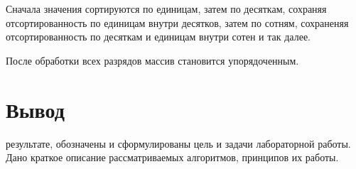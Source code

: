 Сначала значения сортируются по единицам, затем по десяткам, сохраняя отсортированность по единицам внутри десятков, затем по сотням, сохраненяя отсортированность по десяткам и единицам внутри сотен и так далее.

После обработки всех разрядов массив становится упорядоченным.  

\section*{Вывод}
 результате, обозначены и сформулированы цель и задачи лабораторной работы. Дано краткое описание рассматриваемых алгоритмов, принципов их работы.
